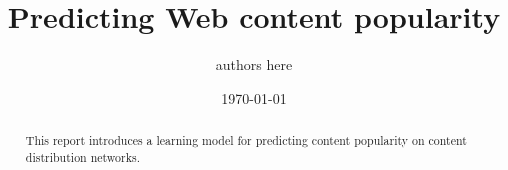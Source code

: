 \documentclass{article}   %
\begin{document}
	\title{Predicting Web content popularity}  

	\author{
       authors here\\
	}
	\date{\today}  
	\maketitle

	\begin{abstract}
      This report introduces a learning model for predicting content 
      popularity on content distribution networks.

	\end{abstract}


	
	
	

%	
%	
\end{document}
